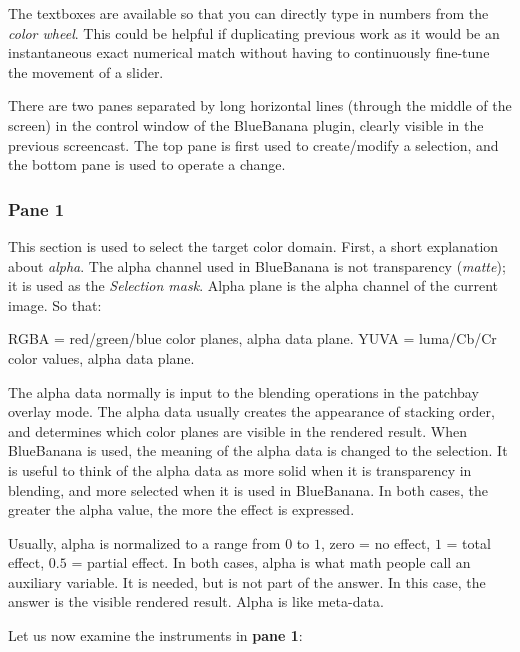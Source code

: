 The textboxes are available so that you can directly type in numbers from the \textit{color wheel}. This could be helpful if duplicating previous work as it would be an instantaneous exact numerical match without having to continuously fine-tune the movement of a slider.

There are two panes separated by long horizontal lines (through the middle of the screen) in the control window of the BlueBanana plugin, clearly visible in the previous screencast. The top pane is first used to create/modify a selection, and the bottom pane is used to operate a change.

\subsubsection*{Pane 1}
\label{ssub:pane1}

This section is used to select the target color domain. First, a short explanation about \textit{alpha}. The alpha channel used in BlueBanana is not transparency (\textit{matte}); it is used as the \textit{Selection mask}. Alpha plane is the alpha channel of the current image. So that:

RGBA = red/green/blue color planes, alpha data plane. 
YUVA = luma/Cb/Cr color values, alpha data plane.

The alpha data normally is input to the blending operations in the patchbay overlay mode. The alpha data usually creates the appearance of stacking order, and determines which color planes are visible in the rendered result. When BlueBanana is used, the meaning of the alpha data is changed to the selection. It is useful to think of the alpha data as more solid when it is transparency in blending, and more selected when it is used in BlueBanana. In both cases, the greater the alpha value, the more the effect is expressed.

Usually, alpha is normalized to a range from $0$ to $1$, zero = no effect, $1$ = total effect, $0.5$ = partial effect. In both cases, alpha is what math people call an auxiliary variable. It is needed, but is not part of the answer. In this case, the answer is the visible rendered result. Alpha is like meta-data.

Let us now examine the instruments in \textbf{pane 1}:

